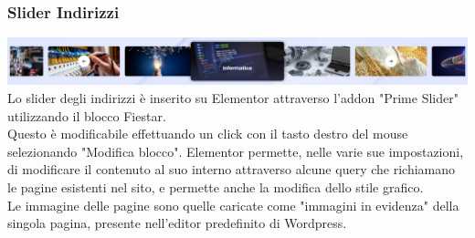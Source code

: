 \documentclass{article}
\begin{document}
	\subsubsection{\textbf{Slider Indirizzi}}
		\includegraphics[scale=0.19]{Slider Indirizzi.jpeg}\\
		Lo slider degli indirizzi è inserito su Elementor attraverso l'addon "Prime Slider" utilizzando il blocco Fiestar.\\
		Questo è modificabile effettuando un click con il tasto destro del mouse selezionando "Modifica blocco".
		Elementor permette, nelle varie sue impostazioni, di modificare il contenuto al suo interno attraverso alcune query che richiamano le pagine esistenti nel sito, e permette anche la modifica dello stile grafico.\\
		Le immagine delle pagine sono quelle caricate come "immagini in evidenza" della singola pagina, presente nell'editor predefinito di Wordpress. 
\end{document}
